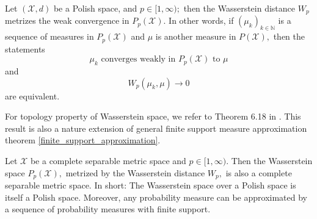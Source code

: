 \begin{thm}[$W _ { p }$  metrizes \( P _ { p } \)]
	Let \( ( \mathcal { X } , d ) \) be a Polish space, and \( p \in [ 1 , \infty ) ; \) then the Wasserstein distance \( W _ { p } \) metrizes the weak convergence in \( P _ { p } ( \mathcal { X } ) . \) In other words, if \( \left( \mu _ { k } \right) _ { k \in \mathbb { N } } \) is a sequence of measures in \( P _ { p } ( \mathcal { X } ) \) and \( \mu \) is another measure in \( P ( \mathcal { X } ) , \) then the statements
	\[ \mu _ { k } \text { converges weakly in } P _ { p } ( \mathcal { X } ) \text { to } \mu \]
	and
	\[ W _ { p } \left( \mu _ { k } , \mu \right) \longrightarrow 0 \]
	are equivalent.
\end{thm}

For topology property of Wasserstein space, we refer to Theorem 6.18 in \cite{villani2008optimal}. This result is also a nature extension of general finite support measure approximation theorem \ref{finite_support_approximation}.
\begin{thm}
	\label{topology_Wasserstein}
	Let \( \mathcal { X } \) be a complete separable metric space and \( p \in [ 1 , \infty ) \). Then the Wasserstein space \( P _ { p } ( \mathcal { X } ) , \) metrized by the Wasserstein distance \( W _ { p } , \) is also a complete separable metric space. In short: The Wasserstein space over a Polish space is itself a Polish space. Moreover, any probability measure can be approximated by a sequence of probability measures with ﬁnite support.
\end{thm}


